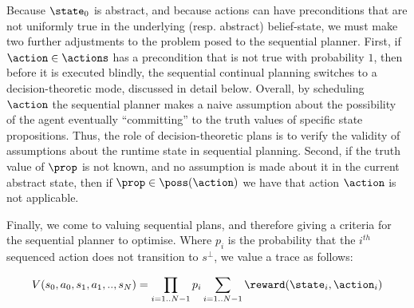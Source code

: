 Because $\state_0$ is abstract, and because actions can have
preconditions that are not uniformly true in the underlying
(resp. abstract) belief-state, we must make two further adjustments to
the problem posed to the sequential planner. First, if
$\action\in\actions$ has a precondition that is not true with
probability $1$, then before it is executed blindly, the sequential
continual planning switches to a decision-theoretic mode, discussed in
detail below. Overall, by scheduling $\action$ the sequential planner
makes a naive assumption about the possibility of the agent eventually
``committing'' to the truth values of specific state
propositions. Thus, the role of decision-theoretic plans is to verify
the validity of assumptions about the runtime state in sequential
planning. Second, if the truth value of $\prop$ is not known, and no
assumption is made about it in the current abstract state, then if
$\prop \in
\poss(\action)$ we have that action $\action$ is not applicable.




Finally, we come to valuing sequential plans, and therefore giving a
criteria for the sequential planner to optimise. Where $p_i$ is the
probability that the $i^{th}$ sequenced action does not transition to
$s^\bot$, we value a trace as follows:

\begin{equation}\label{eq:tracevalue}
V(s_0, a_0, s_1, a_1,.., s_N) =  \prod_{i=1..N-1} p_i \sum_{i=1..N-1} \reward(\state_i, \action_i)
\end{equation}

